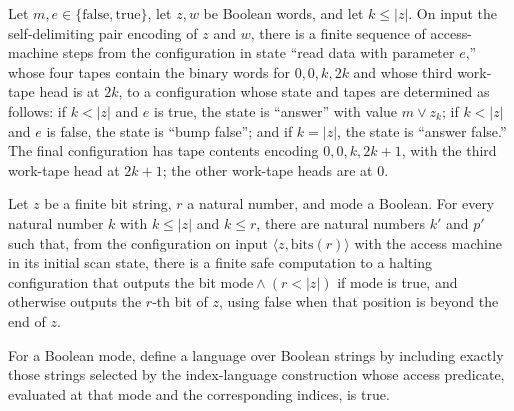 \begin{lemma}
\label{Complexity.LogProg.access_data_run}
\leanok
{}
Let $m,e\in\{\mathrm{false},\mathrm{true}\}$, let $z,w$ be Boolean words, and let $k\le
|z|$. On input the self-delimiting pair encoding of $z$ and $w$, there is a finite
sequence of access-machine steps from the configuration in state “read data with
parameter $e$,” whose four tapes contain the binary words for $0,0,k,2k$ and whose third
work-tape head is at $2k$, to a configuration whose state and tapes are determined as
follows: if $k<|z|$ and $e$ is true, the state is “answer” with value $m\lor z_k$; if
$k<|z|$ and $e$ is false, the state is “bump false”; and if $k=|z|$, the state is
“answer false.” The final configuration has tape contents encoding $0,0,k,2k+1$, with
the third work-tape head at $2k+1$; the other work-tape heads are at $0$.
\end{lemma}

\begin{lemma}
\label{Complexity.LogProg.access_valid}
\leanok
{}
Let $z$ be a finite bit string, $r$ a natural number, and $\mathrm{mode}$ a Boolean. For
every natural number $k$ with $k\le |z|$ and $k\le r$, there are natural numbers $k'$
and $p'$ such that, from the configuration on input $\langle z,\mathrm{bits}(r)\rangle$
with the access machine in its initial scan state, there is a finite safe computation to
a halting configuration that outputs the bit $\mathrm{mode}\land(r<|z|)$ if
$\mathrm{mode}$ is true, and otherwise outputs the $r$-th bit of $z$, using false when
that position is beyond the end of $z$.
\end{lemma}

\begin{definition}
\label{Complexity.LogProg.accessLang}
\leanok
{}
For a Boolean mode, define a language over Boolean strings by including exactly those
strings selected by the index-language construction whose access predicate, evaluated at
that mode and the corresponding indices, is true.
\end{definition}

